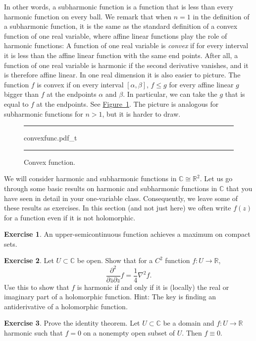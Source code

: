 \documentclass[12pt,openany]{book}
\newcommand{\C}{{\mathbb{C}}}
\newcommand{\R}{{\mathbb{R}}}
\theoremstyle{plain}
\theoremstyle{remark}
\theoremstyle{definition}
\newenvironment{exbox}{%
    \def\FrameCommand{\vrule width 1pt \relax\hspace{10pt}}%
    \MakeFramed{\advance\hsize-\width\FrameRestore}%
}{%
    \endMakeFramed
}
\newenvironment{myfig}{%
\begin{figure}[h!t]
\noindent\rule{\textwidth}{0.5pt}\vspace{12pt}\par\centering}%
{\par\noindent\rule{\textwidth}{0.5pt}
\end{figure}}
\theoremstyle{exercise}
\newtheorem{exercise}{Exercise}[section]
\theoremstyle{example}
\newcommand{\figureref}[1]{\hyperref[#1]{Figure~\ref*{#1}}}
\begin{document}
In other words, a subharmonic function is a function that is less than every
harmonic function on every ball.
We remark that when $n=1$ in the definition of a subharmonic function,
it is the same as the standard definition of a
convex function of one real variable, where affine linear functions play the role of harmonic
functions: A function of one real variable is
\emph{convex} if 
for every interval it is less than the affine linear function with the same
end points.
After all, a function of one real variable is harmonic if the second
derivative vanishes, and it is therefore affine linear.
In one real dimension it is also easier to picture.
The function $f$ is convex if on
every interval $[\alpha,\beta]$, $f \leq g$ for every affine linear $g$
bigger than $f$ at the endpoints $\alpha$ and $\beta$.  In particular, we can
take the $g$ that is equal to $f$ at the endpoints.  See
\figureref{fig:convexfunc}.
The picture is analogous for subharmonic functions for $n > 1$,
but it is harder to draw.

\begin{myfig}
{convexfunc.pdf_t}
\caption{Convex function.\label{fig:convexfunc}}
\end{myfig}

We will consider harmonic and subharmonic functions in $\C \cong
\R^2$.
Let us go through some basic results on harmonic and subharmonic
functions in $\C$ that you have seen in detail in your one-variable class.
Consequently, we leave some of these results as exercises.
In this section (and not just here)
we often write $f(z)$ for a function
even if it is not holomorphic.

\begin{exbox}
\begin{exercise}
An upper-semicontinuous function achieves a maximum on compact sets.
\end{exercise}

\begin{exercise}
Let $U \subset \C$ be open.
Show that for a $C^2$ function $f \colon U \to \R$,
\begin{equation*}
\frac{\partial^2}{\partial \bar{z}\partial z} f = \frac{1}{4} \nabla^2 f .
\end{equation*}
Use this to show that $f$ is harmonic if and only if it is
(locally) the real or imaginary part
of a holomorphic function.
Hint: The key is finding an antiderivative of a holomorphic function.
\end{exercise}

\begin{exercise}
Prove the identity theorem.  Let $U \subset \C$ be a domain
and $f \colon U \to \R$ harmonic such that $f=0$ on a nonempty open subset
of $U$.  Then $f\equiv 0$.
\end{exercise}
\end{exbox}
\end{document}
